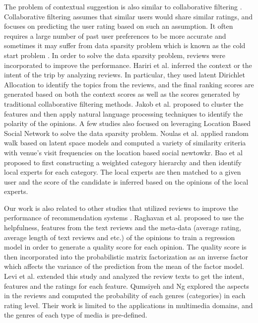 The problem of contextual suggestion is also similar to 
collaborative filtering \cite{Su:2009:SCF:1592474.1722966}. 
Collaborative filtering assumes that similar users
would share similar ratings, and focuses on predicting
the user rating based on such an assumption.
It often requires a large number of past user preferences to be more accurate 
and sometimes it may suffer from data sparsity problem which is known 
as the cold start problem \cite{Schein:2002:MMC:564376.564421}.
In order to solve the data sparsity problem, reviews were 
incorporated to improve the performance. 
Hariri et al. \cite{hariricontext} inferred the context or the intent 
of the trip by analyzing reviews. In particular, they used latent Dirichlet 
Allocation to identify the topics from the reviews, and the final 
ranking scores are generated based on both the context scores as well 
as the scores generated by traditional collaborative filtering methods.  
Jakob et al. \cite{Jakob:2009:BSE:1651461.1651473} proposed to 
cluster the features and then apply natural language processing 
techniques to identify the polarity of the opinions.
A few studies also focused on leveraging Location Based Social Network 
to solve the data sparsity problem. 
Noulas et al. \cite{Noulas:2012:RWA:2411131.2411620} applied random 
walk based on latent space models and computed a variety of 
similarity criteria with venue's visit frequencies on the 
location based social newtowkr. 
Bao et al \cite{Bao:2012:LPR:2424321.2424348} proposed to first 
constructing a weighted category hierarchy and then identify  
local experts for each category. The local experts are then matched 
to a given user and the score of the candidate is inferred based on the 
opinions of the local experts.


Our work is also related to other studies that utilized reviews to improve 
the performance of recommendation systems \cite{Qumsiyeh:2012:PRM:2348283.2348349,SanPedro:2012:LUC:2187836.2187896,Raghavan:2012:RQA:2365952.2365978,hariricontext,Levi:2012:FNH:2365952.2365977}.
Raghavan et al. \cite{Raghavan:2012:RQA:2365952.2365978} proposed to 
use the helpfulness, features from the text reviews and 
the meta-data (average rating, average length of text reviews and etc.) 
of the opinions to train a regression model in order to generate a 
quality score for each opinion. The quality score is then 
incorporated into the probabilistic matrix factorization as an 
inverse factor which affects the variance of the prediction from the 
mean of the factor model.
Levi et al. \cite{Levi:2012:FNH:2365952.2365977} extended 
this study and analyzed the review texts to get the intent, 
features and the ratings for each feature. 
Qumsiyeh and Ng \cite{Qumsiyeh:2012:PRM:2348283.2348349} explored the 
aspects in the reviews and computed the probability of each genres 
(categories) in each rating level. Their work is limited to the 
applications in multimedia domains, and the genres of each type of 
media is pre-defined. 

